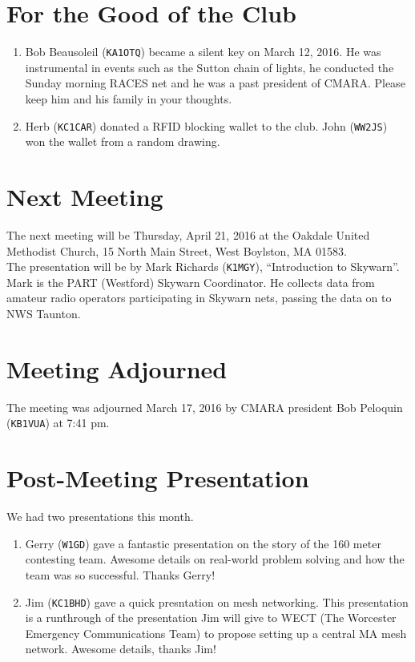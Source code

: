 \documentclass[10pt,letterpaper]{article}
\begin{document}
\section{For the Good of the Club}

\begin{enumerate}
\item Bob Beausoleil (\texttt{KA1OTQ}) became a silent key on March 12, 2016.  He was instrumental in events such as the Sutton chain of lights, he conducted the Sunday morning RACES net and he was a past president of CMARA. Please keep him and his family in your thoughts.
\item Herb (\texttt{KC1CAR}) donated a RFID blocking wallet to the club. John (\texttt{WW2JS}) won the wallet from a random drawing.
\end{enumerate}

\section{Next Meeting}

The next meeting will be Thursday, April 21, 2016 at the Oakdale United Methodist Church, 15 North Main Street, West Boylston, MA 01583.\\

\noindent
The presentation will be by Mark Richards (\texttt{K1MGY}), ``Introduction to Skywarn''. Mark is the PART (Westford) Skywarn Coordinator. He collects data from amateur radio operators participating in Skywarn nets, passing the data on to NWS Taunton.

\section{Meeting Adjourned}
The meeting was adjourned March 17, 2016 by CMARA president Bob Peloquin (\texttt{KB1VUA}) at 7:41 pm.

\section{Post-Meeting Presentation}
We had two presentations this month.
\begin{enumerate}
\item Gerry (\texttt{W1GD}) gave a fantastic presentation on the story of the 160 meter contesting team. Awesome details on real-world problem solving and how the team was so successful. Thanks Gerry!
\item Jim (\texttt{KC1BHD}) gave a quick presntation on mesh networking. This presentation is a runthrough of the presentation Jim will give to WECT (The Worcester Emergency Communications Team) to propose setting up a central MA mesh network. Awesome details, thanks Jim!
\end{enumerate}
\end{document}
